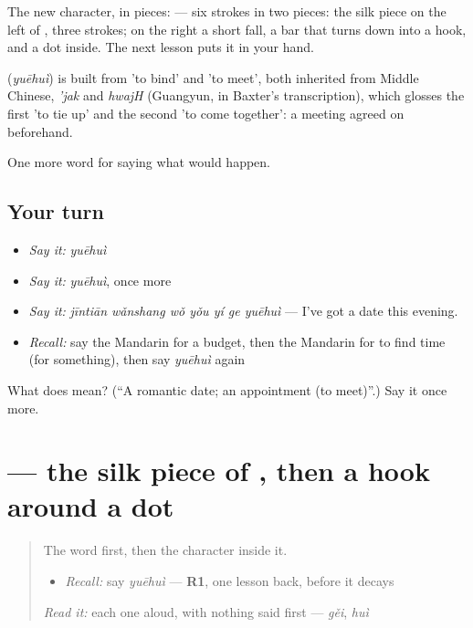The new character, in pieces:  — six strokes in two pieces: the silk piece on the left of , three strokes; on the right a short fall, a bar that turns down into a hook, and a dot inside. The next lesson puts it in your hand.

\begin{cousinweb}
\textbf{} (\emph{yuēhuì}) is built from  'to bind' and  'to meet', both inherited from Middle Chinese, \emph{'jak} and \emph{hwajH} (Guangyun, in Baxter's transcription), which glosses the first 'to tie up' and the second 'to come together': a meeting agreed on beforehand.
\end{cousinweb}

\begin{grammarlens}[title={What you've built}]
One more word for saying what would happen.
\end{grammarlens}

\subsection*{Your turn}
\begin{itemize}
\raggedright
  \item \emph{Say it:} \emph{yuēhuì}
  \item \emph{Say it:} \emph{yuēhuì}, once more
  \item \emph{Say it:} \emph{jīntiān wǎnshang wǒ yǒu yí ge yuēhuì} — I've got a date this evening.
  \item \emph{Recall:} say the Mandarin for a budget, then the Mandarin for to find time (for something), then say \emph{yuēhuì} again
\end{itemize}

\begin{tcolorbox}[breakable,colback=teal!4,colframe=teal!35!black,title={Before you move on}]
What does  mean? (\textquotedblleft{}A romantic date; an appointment (to meet)\textquotedblright{}.) Say it once more.
\end{tcolorbox}
\section[\texorpdfstring{\zh{约} (yuē)}{约 (yuē)}]{ — the silk piece of , then a hook around a dot}

\label{lesson:ZH-W388-yue-arrange}



\begin{quote}
The word first, then the character inside it.

\begin{itemize}
\raggedright
  \item \emph{Recall:} say \emph{yuēhuì} — \textbf{R1}, one lesson back, before it decays
\end{itemize}

\begin{quote}
 
\end{quote}

\emph{Read it:} each one aloud, with nothing said first — \emph{gěi}, \emph{huì}
\end{quote}


